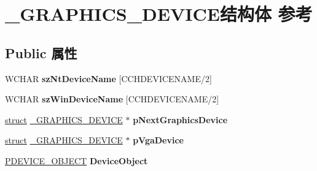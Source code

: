 \hypertarget{struct___g_r_a_p_h_i_c_s___d_e_v_i_c_e}{}\section{\+\_\+\+G\+R\+A\+P\+H\+I\+C\+S\+\_\+\+D\+E\+V\+I\+C\+E结构体 参考}
\label{struct___g_r_a_p_h_i_c_s___d_e_v_i_c_e}
\subsection*{Public 属性}
\begin{DoxyCompactItemize}
\item 
\mbox{\label{struct___g_r_a_p_h_i_c_s___d_e_v_i_c_e_aa3852ad28f469bffb223b10151617c5a}} 
W\+C\+H\+AR {\bfseries sz\+Nt\+Device\+Name} \mbox{[}C\+C\+H\+D\+E\+V\+I\+C\+E\+N\+A\+ME/2\mbox{]}
\item 
\mbox{\label{struct___g_r_a_p_h_i_c_s___d_e_v_i_c_e_a6ea9ca9fed777e767f233ce2b238a33e}} 
W\+C\+H\+AR {\bfseries sz\+Win\+Device\+Name} \mbox{[}C\+C\+H\+D\+E\+V\+I\+C\+E\+N\+A\+ME/2\mbox{]}
\item 
\mbox{\label{struct___g_r_a_p_h_i_c_s___d_e_v_i_c_e_ac8d94c8d2ef834dd1bd65a52ae3c8a3e}} 
\hyperlink{interfacestruct}{struct} \hyperlink{struct___g_r_a_p_h_i_c_s___d_e_v_i_c_e}{\+\_\+\+G\+R\+A\+P\+H\+I\+C\+S\+\_\+\+D\+E\+V\+I\+CE} $\ast$ {\bfseries p\+Next\+Graphics\+Device}
\item 
\mbox{\label{struct___g_r_a_p_h_i_c_s___d_e_v_i_c_e_a2fa0362caea526e42aae7e597bfca4e3}} 
\hyperlink{interfacestruct}{struct} \hyperlink{struct___g_r_a_p_h_i_c_s___d_e_v_i_c_e}{\+\_\+\+G\+R\+A\+P\+H\+I\+C\+S\+\_\+\+D\+E\+V\+I\+CE} $\ast$ {\bfseries p\+Vga\+Device}
\item 
\mbox{\label{struct___g_r_a_p_h_i_c_s___d_e_v_i_c_e_ad889a4e38668a321d8886dc50557a879}} 
\hyperlink{struct___d_e_v_i_c_e___o_b_j_e_c_t}{P\+D\+E\+V\+I\+C\+E\+\_\+\+O\+B\+J\+E\+CT} {\bfseries Device\+Object}
\item 
\mbox{\label{struct___g_r_a_p_h_i_c_s___d_e_v_i_c_e_a052f4a1c52d5f39d1adf0b979f08f4d0}} 

\end{DoxyCompactItemize}
